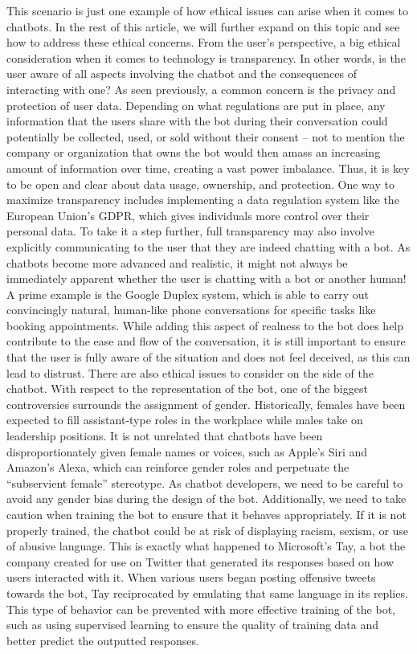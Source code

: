 \documentclass[
	12pt,				%
	oneside,   	        %
	a4paper,			%
	english,			%
	french,				%
	spanish,			%
	brazil,				%
	]{pacotes/abntex2}
\begin{document}
This scenario is just one example of how ethical issues can arise when it comes to chatbots. In the rest of this article, we will further expand on this topic and see how to address these ethical concerns.
From the user’s perspective, a big ethical consideration when it comes to technology is transparency. In other words, is the user aware of all aspects involving the chatbot and the consequences of interacting with one? As seen previously, a common concern is the privacy and protection of user data. Depending on what regulations are put in place, any information that the users share with the bot during their conversation could potentially be collected, used, or sold without their consent – not to mention the company or organization that owns the bot would then amass an increasing amount of information over time, creating a vast power imbalance. Thus, it is key to be open and clear about data usage, ownership, and protection. One way to maximize transparency includes implementing a data regulation system like the European Union’s GDPR, which gives individuals more control over their personal data. 
To take it a step further, full transparency may also involve explicitly communicating to the user that they are indeed chatting with a bot. As chatbots become more advanced and realistic, it might not always be immediately apparent whether the user is chatting with a bot or another human! A prime example is the Google Duplex system, which is able to carry out convincingly natural, human-like phone conversations for specific tasks like booking appointments. While adding this aspect of realness to the bot does help contribute to the ease and flow of the conversation, it is still important to ensure that the user is fully aware of the situation and does not feel deceived, as this can lead to distrust.
There are also ethical issues to consider on the side of the chatbot. With respect to the representation of the bot, one of the biggest controversies surrounds the assignment of gender. Historically, females have been expected to fill assistant-type roles in the workplace while males take on leadership positions. It is not unrelated that chatbots have been disproportionately given female names or voices, such as Apple’s Siri and Amazon’s Alexa, which can reinforce gender roles and perpetuate the “subservient female” stereotype. As chatbot developers, we need to be careful to avoid any gender bias during the design of the bot. 
Additionally, we need to take caution when training the bot to ensure that it behaves appropriately. If it is not properly trained, the chatbot could be at risk of displaying racism, sexism, or use of abusive language. This is exactly what happened to Microsoft’s Tay, a bot the company created for use on Twitter that generated its responses based on how users interacted with it. When various users began posting offensive tweets towards the bot, Tay reciprocated by emulating that same language in its replies. This type of behavior can be prevented with more effective training of the bot, such as using supervised learning to ensure the quality of training data and better predict the outputted responses.
\end{document}
